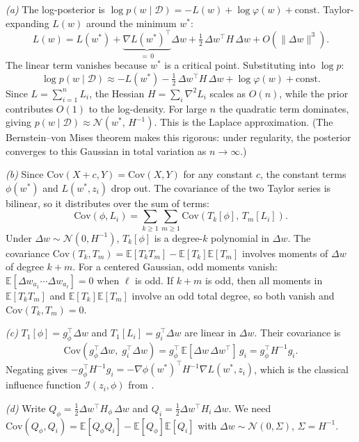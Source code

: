 \documentclass[11pt]{article}
\newcommand{\E}{\mathbb{E}}
\begin{document}
\begin{solution}

\textit{(a)} The log-posterior is $\log p(w\mid\mathcal{D}) = -L(w) + \log\varphi(w) + \mathrm{const}$. Taylor-expanding $L(w)$ around the minimum $w^*$:
\[
  L(w) = L(w^*) + \underbrace{\nabla L(w^*)^\top}_{=\,0}\Delta w + \tfrac{1}{2}\,\Delta w^\top H\,\Delta w + O(\|\Delta w\|^3).
\]
The linear term vanishes because $w^*$ is a critical point. Substituting into $\log p$:
\[
  \log p(w\mid\mathcal{D}) \approx -L(w^*) - \tfrac{1}{2}\,\Delta w^\top H\,\Delta w + \log\varphi(w) + \mathrm{const}.
\]
Since $L = \sum_{i=1}^n L_i$, the Hessian $H = \sum_i \nabla^2 L_i$ scales as $O(n)$, while the prior contributes $O(1)$ to the log-density. For large $n$ the quadratic term dominates, giving $p(w\mid\mathcal{D}) \approx \mathcal{N}(w^*,\,H^{-1})$. This is the Laplace approximation. (The Bernstein--von Mises theorem makes this rigorous: under regularity, the posterior converges to this Gaussian in total variation as $n\to\infty$.)

\textit{(b)} Since $\mathrm{Cov}(X+c,Y) = \mathrm{Cov}(X,Y)$ for any constant $c$, the constant terms $\phi(w^*)$ and $L(w^*,z_i)$ drop out. The covariance of the two Taylor series is bilinear, so it distributes over the sum of terms:
\[
  \mathrm{Cov}(\phi,L_i) = \sum_{k\ge 1}\sum_{m\ge 1}\mathrm{Cov}(T_k[\phi],\,T_m[L_i]).
\]
Under $\Delta w\sim\mathcal{N}(0,H^{-1})$, $T_k[\phi]$ is a degree-$k$ polynomial in $\Delta w$. The covariance $\mathrm{Cov}(T_k,T_m) = \E[T_k T_m] - \E[T_k]\E[T_m]$ involves moments of $\Delta w$ of degree $k+m$. For a centered Gaussian, odd moments vanish: $\E[\Delta w_{a_1}\cdots\Delta w_{a_\ell}] = 0$ when $\ell$ is odd. If $k+m$ is odd, then all moments in $\E[T_k T_m]$ and $\E[T_k]\E[T_m]$ involve an odd total degree, so both vanish and $\mathrm{Cov}(T_k,T_m)=0$.

\textit{(c)} $T_1[\phi] = g_\phi^\top\Delta w$ and $T_1[L_i] = g_i^\top\Delta w$ are linear in $\Delta w$. Their covariance is
\[
  \mathrm{Cov}(g_\phi^\top\Delta w,\;g_i^\top\Delta w) = g_\phi^\top\,\E[\Delta w\,\Delta w^\top]\,g_i = g_\phi^\top H^{-1}g_i.
\]
Negating gives $-g_\phi^\top H^{-1}g_i = -\nabla\phi(w^*)^\top H^{-1}\nabla L(w^*,z_i)$, which is the classical influence function $\mathcal{I}(z_i,\phi)$ from .

\textit{(d)} Write $Q_\phi = \tfrac12\Delta w^\top H_\phi\,\Delta w$ and $Q_i = \tfrac12\Delta w^\top H_i\,\Delta w$. We need $\mathrm{Cov}(Q_\phi,Q_i) = \E[Q_\phi Q_i] - \E[Q_\phi]\E[Q_i]$ with $\Delta w\sim\mathcal{N}(0,\Sigma)$, $\Sigma=H^{-1}$.


\end{solution}
\end{document}
